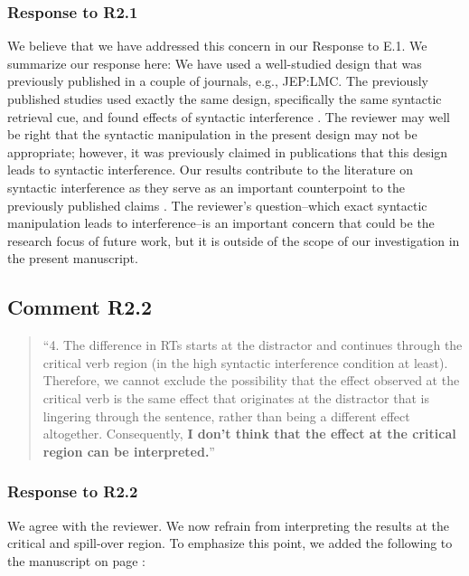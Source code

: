 \documentclass[12pt]{article}
\begin{document}
\subsubsection*{Response to R2.1}
We believe that we have addressed this concern in our Response to E.1. We summarize our response here: We have used a well-studied design that was previously published in a couple of journals, e.g., JEP:LMC. The previously published studies used exactly the same design, specifically the same syntactic retrieval cue, and found effects of syntactic interference \citep{vandyke07,mertzen}. The reviewer may well be right that the syntactic manipulation in the present design may not be appropriate; however, it was previously claimed in publications that this design leads to syntactic interference. Our results contribute to the literature on syntactic interference as they serve as an important counterpoint to the previously published claims \citep{vandyke07, mertzen}. The reviewer's question--which exact syntactic manipulation leads to interference--is an important concern that could be the research focus of future work, but it is outside of the scope of our investigation in the present manuscript. 


\subsection*{Comment R2.2}
\begin{quote}
``4. The difference in RTs starts at the distractor and continues through the critical verb region (in the high syntactic interference condition at least). Therefore, we cannot exclude the possibility that the effect observed at the critical verb is the same effect that originates at the distractor that is lingering through the sentence, rather than being a different effect altogether. Consequently, \textbf{I don't think that the effect at the critical region can be interpreted.}''
\end{quote}

\subsubsection*{Response to R2.2}
We agree with the reviewer. We now refrain from interpreting the results at the critical and spill-over region. To emphasize this point, we added the following to the manuscript on page \pageref{only_precritical}:\\

\begin{quote}
\end{quote}
\end{document}
